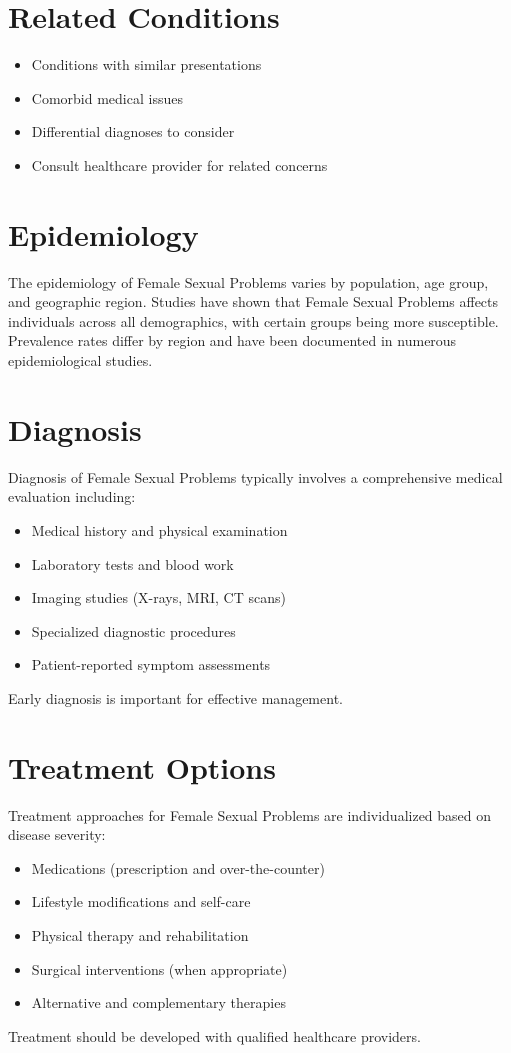 \section*{Related Conditions}
\begin{itemize}
  \item Conditions with similar presentations
  \item Comorbid medical issues
  \item Differential diagnoses to consider
  \item Consult healthcare provider for related concerns
\end{itemize}

\section*{Epidemiology}
The epidemiology of Female Sexual Problems varies by population, age group, and geographic region. Studies have shown that Female Sexual Problems affects individuals across all demographics, with certain groups being more susceptible. Prevalence rates differ by region and have been documented in numerous epidemiological studies.

\section*{Diagnosis}
Diagnosis of Female Sexual Problems typically involves a comprehensive medical evaluation including:
\begin{itemize}
  \item Medical history and physical examination
  \item Laboratory tests and blood work
  \item Imaging studies (X-rays, MRI, CT scans)
  \item Specialized diagnostic procedures
  \item Patient-reported symptom assessments
\end{itemize}
Early diagnosis is important for effective management.

\section*{Treatment Options}
Treatment approaches for Female Sexual Problems are individualized based on disease severity:
\begin{itemize}
  \item Medications (prescription and over-the-counter)
  \item Lifestyle modifications and self-care
  \item Physical therapy and rehabilitation
  \item Surgical interventions (when appropriate)
  \item Alternative and complementary therapies
\end{itemize}
Treatment should be developed with qualified healthcare providers.

